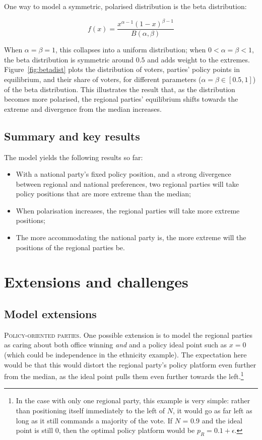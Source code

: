 \documentclass[11pt]{article}
\begin{document}
One way to model a symmetric, polarised distribution is the beta distribution:

\begin{equation*}
    f(x) = \frac{x^{\alpha - 1}(1 - x)^{\beta -1}}{B(\alpha, \beta)}
\end{equation*}

When $\alpha = \beta = 1$, this collapses into a uniform distribution; when $0 < \alpha = \beta < 1$, the beta distribution is symmetric around $0.5$ and adds weight to the extremes. Figure~\ref{fig:betadist} plots the distribution of voters, parties' policy points in equilibrium, and their share of voters, for different parameters ($\alpha = \beta \in [0.5, 1]$) of the beta distribution. This illustrates the result that, as the distribution becomes more polarised, the regional parties' equilibrium shifts towards the extreme and divergence from the median increases.

\subsection{Summary and key results}

The model yields the following results so far:
\begin{itemize}
    \item With a national party's fixed policy position, and a strong divergence between regional and national preferences, two regional parties will take policy positions that are more extreme than the median;
    \item When polarisation increases, the regional parties will take more extreme positions;
    \item The more accommodating the national party is, the more extreme will the positions of the regional parties be.
\end{itemize}



\section{Extensions and challenges}

\subsection{Model extensions}

\textsc{Policy-oriented parties.} One possible extension is to model the regional parties as caring about both office winning \textit{and} and a policy ideal point such as $x = 0$ (which could be independence in the ethnicity example). The expectation here would be that this would distort the regional party's policy platform even further from the median, as the ideal point pulls them even further towards the left.\footnote{In the case with only one regional party, this example is very simple: rather than positioning itself immediately to the left of $N$, it would go as far left as long as it still commands a majority of the vote. If $N$ = 0.9 and the ideal point is still 0, then the optimal policy platform would be $p_R = 0.1 + \epsilon$.}
\end{document}
